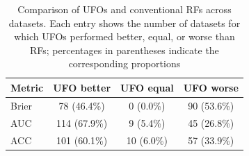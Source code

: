 \begin{table}[ht]
\centering
\caption{Comparison of UFOs and conventional RFs across datasets. Each entry shows the number of datasets for which UFOs performed better, equal, or worse than RFs; percentages in parentheses indicate the corresponding proportions} 
\label{tab:benchmark_results}
\begin{tabular}{lccc}
  \toprule
Metric & UFO better & UFO equal & UFO worse \\ 
  \midrule
Brier & 78 (46.4\%) & 0 (0.0\%) & 90 (53.6\%) \\ 
  AUC & 114 (67.9\%) & 9 (5.4\%) & 45 (26.8\%) \\ 
  ACC & 101 (60.1\%) & 10 (6.0\%) & 57 (33.9\%) \\ 
   \bottomrule
\end{tabular}
\end{table}
